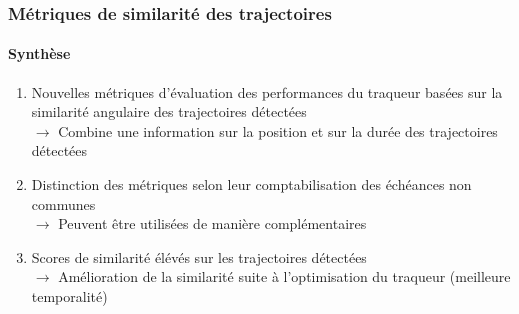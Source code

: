 \documentclass[aspectratio=169, usepdftitle=false, xcolor={dvipsnames}, 9pt,table]{beamer}
\begin{document}
 \begin{frame}
     \frametitle{Métriques de similarité des trajectoires}
     \framesubtitle{Synthèse}
     \begin{block}
         \small
         \begin{enumerate}
             \setlength\itemsep{1em}
             \item<1-> Nouvelles métriques d'évaluation des performances du traqueur basées sur la similarité angulaire des trajectoires détectées\\
                 $\longrightarrow$ Combine une information sur la position et sur la durée des trajectoires détectées
             \item<2-> Distinction des métriques selon leur comptabilisation des échéances non communes\\
                 $\longrightarrow$ Peuvent être utilisées de manière complémentaires
             \item<3-> Scores de similarité élévés sur les trajectoires détectées\\
                 $\longrightarrow$ Amélioration de la similarité suite à l'optimisation du traqueur (meilleure temporalité)
         \end{enumerate}
     \end{block}
 \end{frame}
 
 
\end{document}
